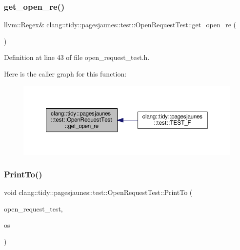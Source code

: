 \subsubsection{\texorpdfstring{get\+\_\+open\+\_\+re()}{get\_open\_re()}}
{\footnotesize\ttfamily llvm\+::\+Regex\& clang\+::tidy\+::pagesjaunes\+::test\+::\+Open\+Request\+Test\+::get\+\_\+open\+\_\+re (\begin{DoxyParamCaption}{ }\end{DoxyParamCaption})\hspace{0.3cm}{\ttfamily [inline]}}



Definition at line 43 of file open\+\_\+request\+\_\+test.\+h.

Here is the caller graph for this function\+:
\nopagebreak
\begin{figure}[H]
\begin{center}
\leavevmode
\includegraphics[width=350pt]{classclang_1_1tidy_1_1pagesjaunes_1_1test_1_1_open_request_test_aa7e59570c4aa74d662437f71ee0ca2d4_icgraph}
\end{center}
\end{figure}
\mbox{\label{classclang_1_1tidy_1_1pagesjaunes_1_1test_1_1_open_request_test_a81ae58d7fd7840265787de397c93dafa}} 
\subsubsection{\texorpdfstring{Print\+To()}{PrintTo()}}
{\footnotesize\ttfamily void clang\+::tidy\+::pagesjaunes\+::test\+::\+Open\+Request\+Test\+::\+Print\+To (\begin{DoxyParamCaption}\item[{const \hyperlink{classclang_1_1tidy_1_1pagesjaunes_1_1test_1_1_open_request_test}{Open\+Request\+Test} \&}]{open\+\_\+request\+\_\+test,  }\item[{\+::std\+::ostream $\ast$}]{os }\end{DoxyParamCaption})}



